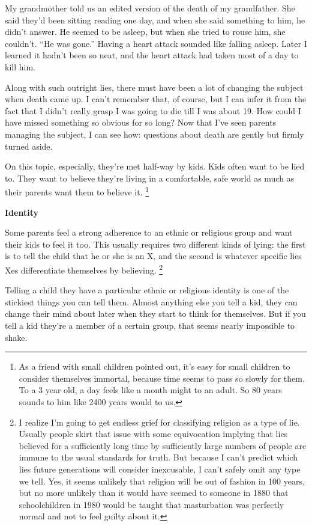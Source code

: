 My grandmother told us an edited version of the death of my grandfather.
She said they'd been sitting reading one day, and when she said
something to him, he didn't answer. He seemed to be asleep, but when she
tried to rouse him, she couldn't. ``He was gone.'' Having a heart attack
sounded like falling asleep. Later I learned it hadn't been so neat, and
the heart attack had taken most of a day to kill him.

Along with such outright lies, there must have been a lot of changing
the subject when death came up. I can't remember that, of course, but I
can infer it from the fact that I didn't really grasp I was going to die
till I was about 19. How could I have missed something so obvious for so
long? Now that I've seen parents managing the subject, I can see how:
questions about death are gently but firmly turned aside.

On this topic, especially, they're met half-way by kids. Kids often want
to be lied to. They want to believe they're living in a comfortable,
safe world as much as their parents want them to believe it.
\footnote{As a friend with small children pointed out, it's easy for small
children to consider themselves immortal, because time seems to pass so
slowly for them. To a 3 year old, a day feels like a month might to an
adult. So 80 years sounds to him like 2400 years would to us.}

\textbf{Identity}

Some parents feel a strong adherence to an ethnic or religious group and
want their kids to feel it too. This usually requires two different
kinds of lying: the first is to tell the child that he or she is an X,
and the second is whatever specific lies Xes differentiate themselves by
believing. \footnote{I realize I'm going to get endless grief for classifying
religion as a type of lie. Usually people skirt that issue with some
equivocation implying that lies believed for a sufficiently long time by
sufficiently large numbers of people are immune to the usual standards
for truth. But because I can't predict which lies future generations
will consider inexcusable, I can't safely omit any type we tell. Yes, it
seems unlikely that religion will be out of fashion in 100 years, but no
more unlikely than it would have seemed to someone in 1880 that
schoolchildren in 1980 would be taught that masturbation was perfectly
normal and not to feel guilty about it.}

Telling a child they have a particular ethnic or religious identity is
one of the stickiest things you can tell them. Almost anything else you
tell a kid, they can change their mind about later when they start to
think for themselves. But if you tell a kid they're a member of a
certain group, that seems nearly impossible to shake.

